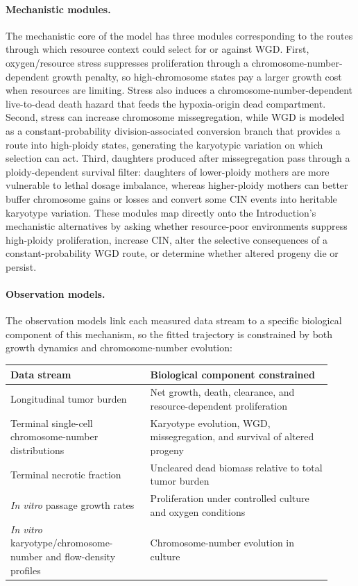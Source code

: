 \documentclass[11pt]{article}
\begin{document}
\paragraph{Mechanistic modules.}
The mechanistic core of the model has three modules corresponding to the routes through which resource context could select for or against WGD. First, oxygen/resource stress suppresses proliferation through a chromosome-number-dependent growth penalty, so high-chromosome states pay a larger growth cost when resources are limiting. Stress also induces a chromosome-number-dependent live-to-dead death hazard that feeds the hypoxia-origin dead compartment. Second, stress can increase chromosome missegregation, while WGD is modeled as a constant-probability division-associated conversion branch that provides a route into high-ploidy states, generating the karyotypic variation on which selection can act. Third, daughters produced after missegregation pass through a ploidy-dependent survival filter: daughters of lower-ploidy mothers are more vulnerable to lethal dosage imbalance, whereas higher-ploidy mothers can better buffer chromosome gains or losses and convert some CIN events into heritable karyotype variation. These modules map directly onto the Introduction's mechanistic alternatives by asking whether resource-poor environments suppress high-ploidy proliferation, increase CIN, alter the selective consequences of a constant-probability WGD route, or determine whether altered progeny die or persist.

\paragraph{Observation models.}
The observation models link each measured data stream to a specific biological component of this mechanism, so the fitted trajectory is constrained by both growth dynamics and chromosome-number evolution:

\begin{center}
\begin{tabular}{p{0.40\linewidth}p{0.52\linewidth}}
\toprule
\textbf{Data stream} & \textbf{Biological component constrained} \\
\midrule
Longitudinal tumor burden & Net growth, death, clearance, and resource-dependent proliferation \\
Terminal single-cell chromosome-number distributions & Karyotype evolution, WGD, missegregation, and survival of altered progeny \\
Terminal necrotic fraction & Uncleared dead biomass relative to total tumor burden \\
\textit{In vitro} passage growth rates & Proliferation under controlled culture and oxygen conditions \\
\textit{In vitro} karyotype/chromosome-number and flow-density profiles & Chromosome-number evolution in culture \\
\bottomrule
\end{tabular}
\end{center}
\end{document}
